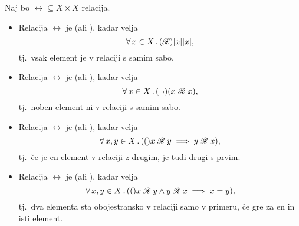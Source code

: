                 \begin{definicija}
                        Naj bo $\rel \subseteq X \times X$ relacija.
                        \begin{itemize}
                                \item
                                        Relacija $\rel$ je  (ali ), kadar velja
                                        \[\all{x \in X} \rel[x][x],\]
                                        tj.~vsak element je v relaciji s samim sabo.
                                \item
                                        Relacija $\rel$ je  (ali ), kadar velja
                                        \[\all{x \in X} \lnot(\rel[x][x]),\]
                                        tj.~noben element ni v relaciji s samim sabo.
                                \item
                                        Relacija $\rel$ je  (ali ), kadar velja
                                        \[\all{x, y \in X} (\rel[x][y] \implies \rel[y][x]),\]
                                        tj.~če je en element v relaciji z drugim, je tudi drugi s prvim.
                                \item
                                        Relacija $\rel$ je  (ali ), kadar velja
                                        \[\all{x, y \in X} (\rel[x][y] \land \rel[y][x] \implies x = y),\]
                                        tj.~dva elementa sta obojestransko v relaciji samo v primeru, če gre za en in isti element.


\end{itemize}
\end{definicija}
